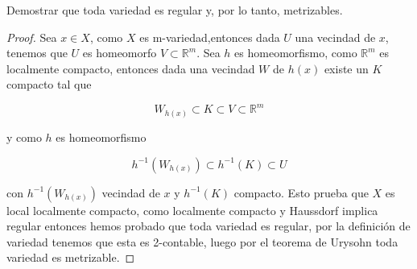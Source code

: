 
\item Demostrar que toda variedad es regular y, por lo tanto, metrizables.

\begin{proof}
    Sea $x \in X$, como $X$ es m-variedad,entonces dada $U$ una vecindad de $x$, tenemos que $U$ es homeomorfo $V\subset \mathbb{R}^m$. Sea $h$ es homeomorfismo, como $\mathbb{R}^m$ es localmente compacto, entonces dada una vecindad $W$ de $h(x)$ existe un $K$ compacto tal que

    $$W_{h(x)}\subset K\subset V\subset \mathbb{R}^m$$

    y como $h$ es homeomorfismo

    $$h^{-1}(W_{h(x)})\subset h^{-1}(K)\subset U$$

    con $h^{-1}(W_{h(x)})$ vecindad de $x$ y $h^{-1}(K)$ compacto. Esto prueba que $X$ es local localmente compacto, como localmente compacto y Haussdorf implica  regular entonces hemos probado que toda variedad es regular, por la definición de variedad tenemos que esta es 2-contable, luego por el teorema de Urysohn toda variedad es metrizable.
\end{proof}